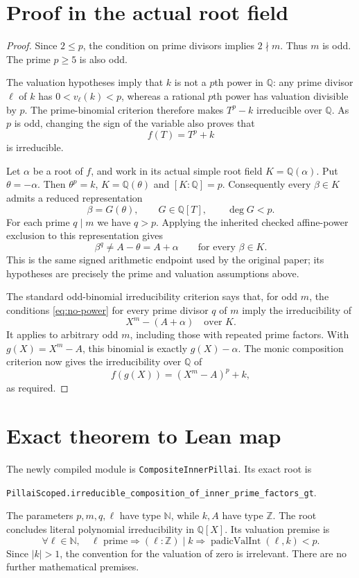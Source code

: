 \documentclass[11pt,letterpaper]{article}
\newcommand{\Q}{\mathbb Q}
\newcommand{\Z}{\mathbb Z}
\newcommand{\lean}[1]{{\small\urlstyle{tt}\nolinkurl{#1}}}
\begin{document}
\section{Proof in the actual root field}
\begin{proof}
Since $2\le p$, the condition on prime divisors implies $2\nmid m$.
Thus $m$ is odd. The prime $p\ge5$ is also odd.

The valuation hypotheses imply that $k$ is not a $p$th power in $\Q$:
any prime divisor $\ell$ of $k$ has $0<v_\ell(k)<p$, whereas a rational
$p$th power has valuation divisible by $p$. The prime-binomial criterion
therefore makes $T^p-k$ irreducible over $\Q$. As $p$ is odd, changing the
sign of the variable also proves that
\[
                         f(T)=T^p+k
\]
is irreducible.

Let $\alpha$ be a root of $f$, and work in its actual simple root field
$K=\Q(\alpha)$. Put $\theta=-\alpha$. Then $\theta^p=k$,
$K=\Q(\theta)$ and $[K:\Q]=p$. Consequently every $\beta\in K$ admits a
reduced representation
\[
             \beta=G(\theta),\qquad G\in\Q[T],\qquad \deg G<p.
\]
For each prime $q\mid m$ we have $q>p$. Applying the inherited checked
affine-power exclusion to this representation gives
\begin{equation}\label{eq:no-power}
                \beta^q\ne A-\theta=A+\alpha
                \qquad\text{for every }\beta\in K.
\end{equation}
This is the same signed arithmetic endpoint used by the original paper;
its hypotheses are precisely the prime and valuation assumptions above.

The standard odd-binomial irreducibility criterion says that, for odd
$m$, the conditions \eqref{eq:no-power} for every prime divisor $q$ of $m$
imply the irreducibility of
\[
                       X^m-(A+\alpha)\quad\text{over }K.
\]
It applies to arbitrary odd $m$, including those with repeated prime
factors. With $g(X)=X^m-A$, this binomial is exactly $g(X)-\alpha$.
The monic composition criterion now gives the irreducibility over $\Q$ of
\[
                     f(g(X))=(X^m-A)^p+k,
\]
as required.
\end{proof}

\section{Exact theorem to Lean map}
The newly compiled module is \lean{CompositeInnerPillai}. Its exact root is
\begin{center}
\lean{PillaiScoped.irreducible_composition_of_inner_prime_factors_gt}.
\end{center}
The parameters $p,m,q,\ell$ have type $\mathbb N$, while $k,A$ have type
$\mathbb Z$. The root concludes literal polynomial irreducibility in
$\Q[X]$. Its valuation premise is
\[
 \forall\ell\in\mathbb N,\quad\ell\text{ prime}\Longrightarrow
 (\ell:\Z)\mid k\Longrightarrow\operatorname{padicValInt}(\ell,k)<p.
\]
Since $|k|>1$, the convention for the valuation of zero is irrelevant.
There are no further mathematical premises.
\end{document}
